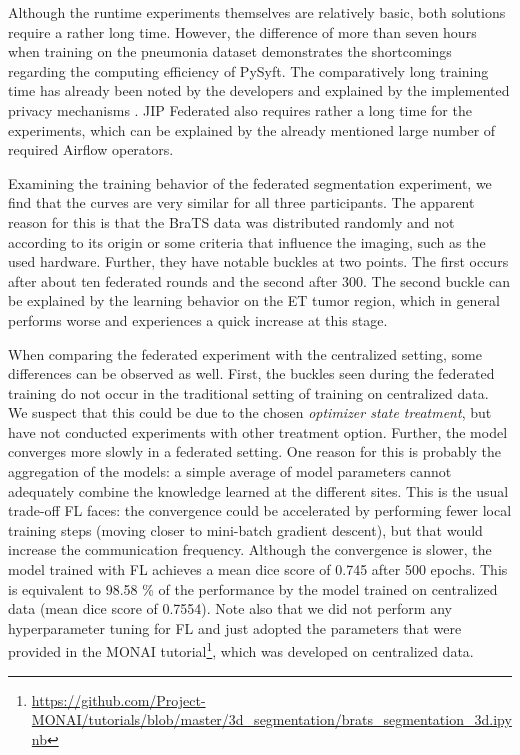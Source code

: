 Although the runtime experiments themselves are relatively basic, both solutions require a rather long time.
However, the difference of more than seven hours when training on the pneumonia dataset demonstrates the shortcomings regarding the computing efficiency of PySyft. The comparatively long training time has already been noted by the developers and explained by the implemented privacy mechanisms \citep{Ryffel2018ALearning}.
JIP Federated also requires rather a long time for the experiments, which can be explained by the already mentioned large number of required Airflow operators.


Examining the training behavior of the federated segmentation experiment,
we find that the curves are very similar for all three participants. The apparent reason for this is that the BraTS data was distributed randomly and not according to its origin or some criteria that influence the imaging, such as the used hardware.
Further, they have notable buckles at two points. The first occurs after about ten federated rounds and the second after 300.
The second buckle can be explained by the learning behavior on the ET tumor region, which in general performs worse and experiences a quick increase at this stage.

When comparing the federated experiment with the centralized setting, some differences can be observed as well.
First, the buckles seen during the federated training do not occur in the traditional setting of training on centralized data. We suspect that this could be due to the chosen \textit{optimizer state treatment}, but have not conducted experiments with other treatment option.
Further, the model converges more slowly in a federated setting. One reason for this is probably the aggregation of the models: a simple average of model parameters cannot adequately combine the knowledge learned at the different sites. This is the usual trade-off FL faces: the convergence could be accelerated by performing fewer local training steps (moving closer to mini-batch gradient descent), but that would increase the communication frequency. %
Although the convergence is slower, the model trained with FL achieves a mean dice score of 0.745 after 500 epochs. This is equivalent to 98.58 \% of the performance by the model trained on centralized data (mean dice score of 0.7554). Note also that we did not perform any hyperparameter tuning for FL and just adopted the parameters that were provided in the MONAI tutorial\footnote{\url{https://github.com/Project-MONAI/tutorials/blob/master/3d\_segmentation/brats\_segmentation\_3d.ipynb}}, which was developed on centralized data.
